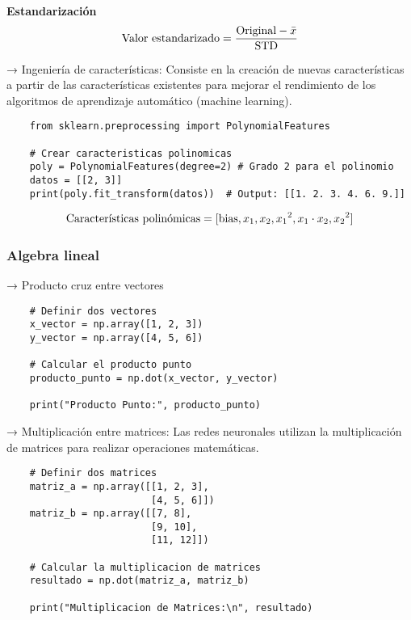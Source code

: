 \documentclass{templateNote}
\begin{document}
\begin{center}
    \textbf{Estandarización}
    \begin{equation*}
        \textnormal{Valor estandarizado} = \frac{\textnormal{Original} - \bar{x}}{\textnormal{STD}} 
    \end{equation*}
\end{center}
 
 → Ingeniería de características: Consiste en la creación de nuevas características a partir de las características existentes para mejorar el rendimiento de los algoritmos de aprendizaje automático (machine learning).
\begin{lstlisting}
    from sklearn.preprocessing import PolynomialFeatures

    # Crear caracteristicas polinomicas
    poly = PolynomialFeatures(degree=2) # Grado 2 para el polinomio
    datos = [[2, 3]]
    print(poly.fit_transform(datos))  # Output: [[1. 2. 3. 4. 6. 9.]]
\end{lstlisting}
\begin{align*}
    \textnormal{Características polinómicas} = [\textnormal{bias}, x_1, x_2, {x_1}^2, x_1 \cdot x_2, {x_2}^2]
\end{align*}

\subsubsection*{Algebra lineal}

 → Producto cruz entre vectores
\begin{lstlisting}
    # Definir dos vectores
    x_vector = np.array([1, 2, 3])
    y_vector = np.array([4, 5, 6])
    
    # Calcular el producto punto
    producto_punto = np.dot(x_vector, y_vector)
    
    print("Producto Punto:", producto_punto)
\end{lstlisting}

 → Multiplicación entre matrices: Las redes neuronales utilizan la multiplicación de matrices para realizar operaciones matemáticas.
\begin{lstlisting}
    # Definir dos matrices
    matriz_a = np.array([[1, 2, 3],
                         [4, 5, 6]])
    matriz_b = np.array([[7, 8],
                         [9, 10],
                         [11, 12]])
    
    # Calcular la multiplicacion de matrices
    resultado = np.dot(matriz_a, matriz_b)
    
    print("Multiplicacion de Matrices:\n", resultado)
\end{lstlisting}
\end{document}
